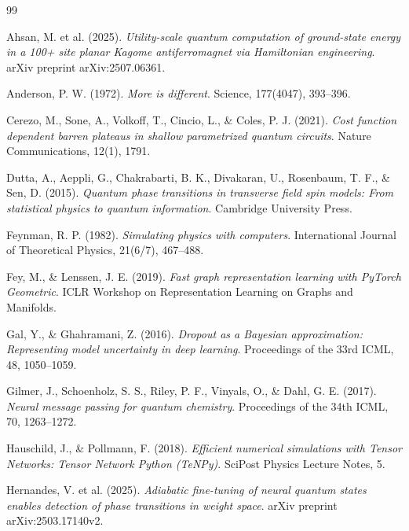 \documentclass[11pt,a4paper,spanish]{book}
\begin{document}
\begin{thebibliography}{99}

 Ahsan, M. et al. (2025). \emph{Utility-scale quantum computation of ground-state energy in a 100+ site planar Kagome antiferromagnet via Hamiltonian engineering}. arXiv preprint arXiv:2507.06361.

 Anderson, P. W. (1972). \emph{More is different}. Science, 177(4047), 393--396.

 Cerezo, M., Sone, A., Volkoff, T., Cincio, L., \& Coles, P. J. (2021). \emph{Cost function dependent barren plateaus in shallow parametrized quantum circuits}. Nature Communications, 12(1), 1791.

 Dutta, A., Aeppli, G., Chakrabarti, B. K., Divakaran, U., Rosenbaum, T. F., \& Sen, D. (2015). \emph{Quantum phase transitions in transverse field spin models: From statistical physics to quantum information}. Cambridge University Press.

 Feynman, R. P. (1982). \emph{Simulating physics with computers}. International Journal of Theoretical Physics, 21(6/7), 467--488.

 Fey, M., \& Lenssen, J. E. (2019). \emph{Fast graph representation learning with PyTorch Geometric}. ICLR Workshop on Representation Learning on Graphs and Manifolds.

 Gal, Y., \& Ghahramani, Z. (2016). \emph{Dropout as a Bayesian approximation: Representing model uncertainty in deep learning}. Proceedings of the 33rd ICML, 48, 1050--1059.

 Gilmer, J., Schoenholz, S. S., Riley, P. F., Vinyals, O., \& Dahl, G. E. (2017). \emph{Neural message passing for quantum chemistry}. Proceedings of the 34th ICML, 70, 1263--1272.

 Hauschild, J., \& Pollmann, F. (2018). \emph{Efficient numerical simulations with Tensor Networks: Tensor Network Python (TeNPy)}. SciPost Physics Lecture Notes, 5.

 Hernandes, V. et al. (2025). \emph{Adiabatic fine-tuning of neural quantum states enables detection of phase transitions in weight space}. arXiv preprint arXiv:2503.17140v2.


\end{thebibliography}
\end{document}
